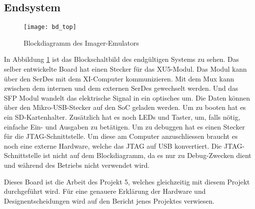 \subsection{Endsystem}
\begin{figure}[b]
    \centering
    \texttt{[image: bd\_top]}
    \caption{Blockdiagramm des Imager-Emulators}
    \label{fig:bd_top}
\end{figure}

In Abbildung \ref{fig:bd_top} ist das Blockschaltbild des endgültigen Systems zu sehen. Das selber entwickelte Board hat einen Stecker für das XU5-Modul. Das Modul kann über den SerDes mit dem XI-Computer kommunizieren. Mit dem Mux kann zwischen dem internen und dem externen SerDes gewechselt werden. Und das SFP Modul wandelt das elektrische Signal in ein optisches um. Die Daten können über den Mikro-USB-Stecker auf den SoC geladen werden. Um zu booten hat es ein SD-Kartenhalter. Zusätzlich hat es noch LEDs und Taster, um, falls nötig, einfache Ein- und Ausgaben zu betätigen. Um zu debuggen hat es einen Stecker für die JTAG-Schnittstelle. Um diese am Computer anzuschliessen braucht es noch eine externe Hardware, welche das JTAG auf USB konvertiert. Die JTAG-Schnittstelle ist nicht auf dem Blockdiagramm, da es nur zu Debug-Zwecken dient und während des Betriebs nicht verwendet wird. 

Dieses Board ist die Arbeit des Projekt 5, welches gleichzeitig mit diesem Projekt durchgeführt wird. Für eine genauere Erklärung der Hardware und Designentscheidungen wird auf den Bericht jenes Projektes verwiesen.
